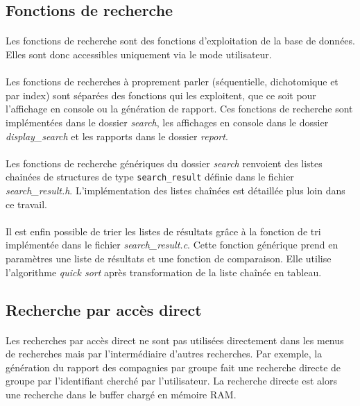\documentclass{article}
\begin{document}
    \subsection{Fonctions de recherche}
    \paragraph{}
    Les fonctions de recherche sont des fonctions d'exploitation de la base de données. Elles sont donc accessibles uniquement via le mode utilisateur.

    \paragraph{}
    Les fonctions de recherches à proprement parler (séquentielle, dichotomique et par index) sont séparées des fonctions qui les exploitent, que ce soit pour l'affichage en console ou la génération de rapport. Ces fonctions de recherche sont implémentées dans le dossier \emph{search}, les affichages en console dans le dossier \emph{display\_search} et les rapports dans le dossier \emph{report}.

    \paragraph{}
    Les fonctions de recherche génériques du dossier \emph{search} renvoient des listes chainées de structures de type \texttt{search\_result} définie dans le fichier \emph{search\_result.h}. L'implémentation des listes chaînées est détaillée plus loin dans ce travail.

    \paragraph{}
    Il est enfin possible de trier les listes de résultats grâce à la fonction de tri implémentée dans le fichier \emph{search\_result.c}. Cette fonction générique prend en paramètres une liste de résultats et une fonction de comparaison. Elle utilise l'algorithme \emph{quick sort} après transformation de la liste chaînée en tableau.


    \subsection{Recherche par accès direct}
    \paragraph{}
    Les recherches par accès direct ne sont pas utilisées directement dans les menus de recherches mais par l'intermédiaire d'autres recherches. Par exemple, la génération du rapport des compagnies par groupe fait une recherche directe de groupe par l'identifiant cherché par l'utilisateur. La recherche directe est alors une recherche dans le buffer chargé en mémoire RAM.
\end{document}
